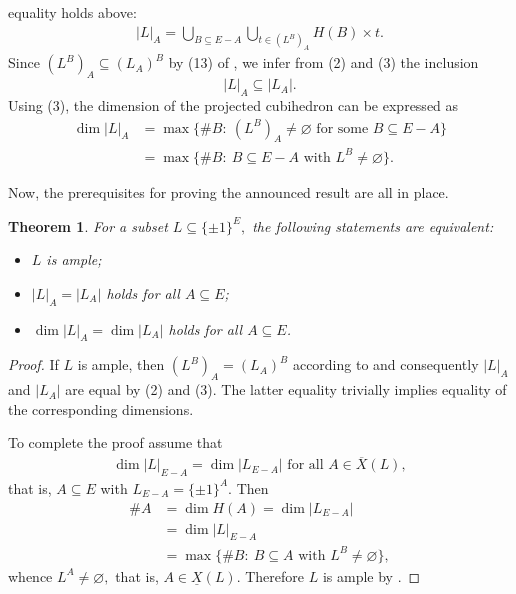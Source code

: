 \documentclass[11pt,a4paper]{amsart}
\newtheorem{theorem}{Theorem}
\theoremstyle{definition}
\numberwithin{equation}{section}
\newcommand{\covectors}{\ensuremath{L}}
\newcommand{\X}{\ensuremath{X}}
\newcommand{\HH}{\ensuremath{H}}
\begin{document}
equality holds above:
\begin{align*}
|{\covectors}|_A=\bigcup_{B\subseteq E-A}\bigcup_{t\in (\covectors^B)_A} \HH(B)\times t.\tag{3}
\end{align*}
Since $(\covectors^B)_A\subseteq (\covectors_A)^B$ by (13) of \cite{BaChDrKo}, we infer from (2) and (3) the inclusion
$$|\covectors|_A\subseteq |\covectors_A|.$$
Using (3), the dimension of the projected cubihedron can be expressed as
\begin{align*}
\dim |\covectors|_A&=\max \{ \#B: ~(\covectors^B)_A\ne\varnothing \mbox{ for some } B\subseteq E-A\}  \tag{4}\\
&=\max\{ \#B: ~B\subseteq E-A \mbox{ with } \covectors^B\ne\varnothing\}.
\end{align*}

Now, the prerequisites for proving the announced result are all in place.


\begin{theorem}
For a subset  ${\covectors}\subseteq \{ \pm 1\}^E,$
the following statements are equivalent:
\begin{itemize}
\item[\rm(i)] ${\covectors}$ is ample;
\item[\rm(ii)] $|{\covectors}|_A=|{\covectors}_A|$ holds for all $A\subseteq E$;
\item[\rm(iii)] $\dim |{\covectors}|_A=\dim |{\covectors}_A|$ holds for
  all $A\subseteq E$.
\end{itemize}
\end{theorem}

\begin{proof} If $\covectors$ is ample, then $(\covectors^B)_A=(\covectors_A)^B$ according to \cite[Theorem 2]{BaChDrKo} and consequently
$|\covectors|_A$ and $|\covectors_A|$ are equal by (2) and (3). The latter equality trivially implies equality of the corresponding dimensions.

To complete the proof assume that
\begin{align*}
\dim |\covectors|_{E-A}=\dim |\covectors_{E-A}| \mbox{ for all } A\in \overline{\X}(\covectors),
\end{align*}
that is, $A\subseteq E$ with $\covectors_{E-A}=\{ \pm 1\}^A.$ Then
\begin{align*}
\# A &=\dim \HH(A)=\dim |{\covectors}_{E-A}|\\
&=\dim|{\covectors}|_{E-A}\\
&= \max\{ \# B: ~B\subseteq A \mbox{ with } \covectors^B\ne\varnothing\},
\end{align*}
whence $\covectors^A\ne\varnothing,$ that is, $A\in \underline{\X}(\covectors).$ Therefore $\covectors$ is ample by \cite[Theorem 2]{BaChDrKo}.
\end{proof}
\end{document}

